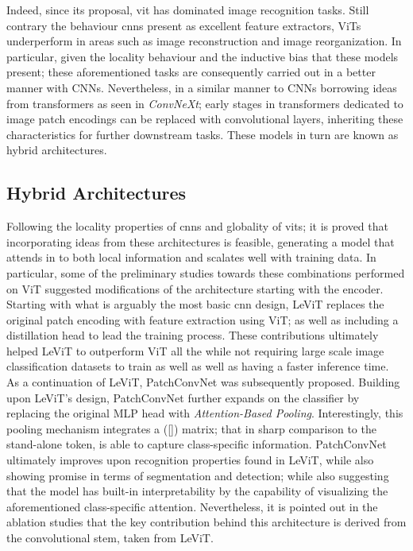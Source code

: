\noindent Indeed, since its proposal, \gls{vit} has dominated image recognition tasks. Still 
contrary the behaviour \glspl{cnn} present as excellent feature extractors, ViTs underperform in 
areas such as image reconstruction and image reorganization. In particular, given the locality 
behaviour and the inductive bias that these models present; these aforementioned tasks are 
consequently carried out in a better manner with CNNs. Nevertheless, in a similar manner to 
CNNs borrowing ideas from transformers as seen in \emph{ConvNeXt}; early stages in transformers 
dedicated to image patch encodings can be replaced with convolutional layers, inheriting these 
characteristics for further downstream tasks. These models in turn are known as hybrid 
architectures.


\subsection{Hybrid Architectures}
\label{rel:sub_hybrid}
Following the locality properties of \glspl{cnn} and globality of \glspl{vit}; it is proved 
that incorporating ideas from these architectures is feasible, generating a model that attends in 
to both local information and scalates well with training data. In particular, some of the 
preliminary studies towards these combinations performed on ViT suggested modifications of the 
architecture starting with the encoder. Starting with what is arguably the most basic \gls{cnn} 
design, LeViT \autocite{graham2021levit} replaces the original patch encoding with feature 
extraction using ViT; as well as including a distillation head to lead the training process. 
These contributions ultimately helped LeViT to outperform ViT all the while not requiring large 
scale image classification datasets to train as well as well as having a faster inference time.\\

\noindent As a continuation of LeViT, PatchConvNet \autocite{touvron2021augmenting} was subsequently 
proposed. Building upon LeViT's design, PatchConvNet further expands on the classifier by 
replacing the original MLP head with \emph{Attention-Based Pooling}. Interestingly, this 
pooling mechanism integrates a ([]) matrix; that in sharp comparison to the stand-alone 
token, is able to capture class-specific information. PatchConvNet ultimately improves upon 
recognition properties found in LeViT, while also showing promise in terms of segmentation and 
detection; while also suggesting that the model has built-in interpretability by the capability of 
visualizing the aforementioned class-specific attention. Nevertheless, it is pointed out in the 
ablation studies that the key contribution behind this architecture is derived from the 
convolutional stem, taken from LeViT.\\ 

